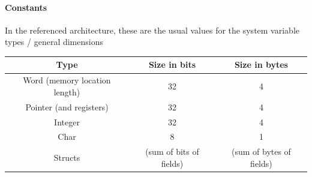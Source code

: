 \documentclass{article}
\begin{document}
				\paragraph{Constants}
					In the referenced architecture, these are the usual values for the system variable types / general dimensions
					
					\begin{center}
						\begin{tabular}{ |c|c|c|}
							\hline
							Type & Size in bits & Size in bytes \\
							\hline
							\hline
							Word (memory location length) & 32 & 4\\
							Pointer (and registers) & 32 & 4 \\
							Integer & 32 & 4 \\
							Char & 8 & 1 \\
							Structs & (sum of bits of fields) & (sum of bytes of fields)\\
							\hline 
						\end{tabular}
					\end{center}
					
\end{document}
